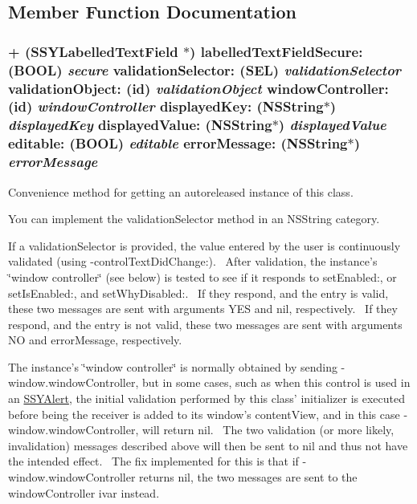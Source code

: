\subsection{Member Function Documentation}
\hypertarget{interface_s_s_y_labelled_text_field_771e047022ab3abff4b688d29de85089}{
\subsubsection[{labelledTextFieldSecure:validationSelector:validationObject:windowController:displayedKey:displayedValue:editable:errorMessage:}]{\setlength{\rightskip}{0pt plus 5cm}+ ({\bf SSYLabelledTextField} $\ast$) labelledTextFieldSecure: (BOOL) {\em secure}\/ validationSelector: (SEL) {\em validationSelector}\/ validationObject: (id) {\em validationObject}\/ windowController: (id) {\em windowController}\/ displayedKey: (NSString$\ast$) {\em displayedKey}\/ displayedValue: (NSString$\ast$) {\em displayedValue}\/ editable: (BOOL) {\em editable}\/ errorMessage: (NSString$\ast$) {\em errorMessage}}}
\label{interface_s_s_y_labelled_text_field_771e047022ab3abff4b688d29de85089}


Convenience method for getting an autoreleased instance of this class. 

You can implement the validationSelector method in an NSString category.

If a validationSelector is provided, the value entered by the user is continuously validated (using -controlTextDidChange:).~ After validation, the instance's \char`\"{}window controller\char`\"{} (see below) is tested to see if it responds to setEnabled:, or setIsEnabled:, and setWhyDisabled:.~ If they respond, and the entry is valid, these two messages are sent with arguments YES and nil, respectively.~ If they respond, and the entry is not valid, these two messages are sent with arguments NO and errorMessage, respectively.

The instance's \char`\"{}window controller\char`\"{} is normally obtained by sending -window.windowController, but in some cases, such as when this control is used in an \hyperlink{interface_s_s_y_alert}{SSYAlert}, the initial validation performed by this class' initializer is executed before being the receiver is added to its window's contentView, and in this case -window.windowController, will return nil.~ The two validation (or more likely, invalidation) messages described above will then be sent to nil and thus not have the intended effect.~ The fix implemented for this is that if -window.windowController returns nil, the two messages are sent to the windowController ivar instead.

